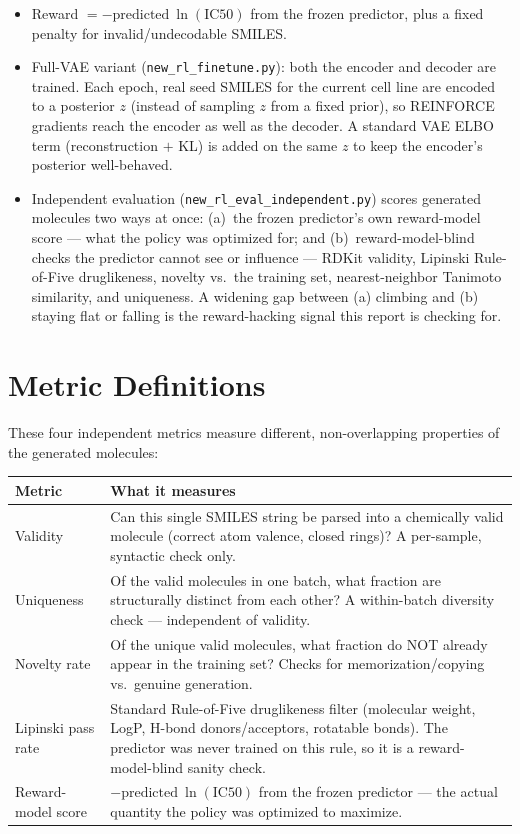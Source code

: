 \documentclass[11pt]{article}
\newcommand{\code}[1]{\texttt{#1}}
\begin{document}
\begin{itemize}
  \item Reward $= -\text{predicted}\ \ln(\text{IC50})$ from the frozen predictor, plus a fixed penalty for invalid/undecodable SMILES.
  \item Full-VAE variant (\code{new\_rl\_finetune.py}): both the encoder and decoder are trained. Each epoch, real seed SMILES for the current cell line are encoded to a posterior $z$ (instead of sampling $z$ from a fixed prior), so REINFORCE gradients reach the encoder as well as the decoder. A standard VAE ELBO term (reconstruction $+$ KL) is added on the same $z$ to keep the encoder's posterior well-behaved.
  \item Independent evaluation (\code{new\_rl\_eval\_independent.py}) scores generated molecules two ways at once: (a)~the frozen predictor's own reward-model score --- what the policy was optimized for; and (b)~reward-model-blind checks the predictor cannot see or influence --- RDKit validity, Lipinski Rule-of-Five druglikeness, novelty vs.\ the training set, nearest-neighbor Tanimoto similarity, and uniqueness. A widening gap between (a) climbing and (b) staying flat or falling is the reward-hacking signal this report is checking for.
\end{itemize}

\section{Metric Definitions}

These four independent metrics measure different, non-overlapping properties of the generated molecules:

\begin{center}
\begin{tabular}{@{}l p{}@{}}
\toprule
\textbf{Metric} & \textbf{What it measures} \\
\midrule
Validity & Can this single SMILES string be parsed into a chemically valid molecule (correct atom valence, closed rings)? A per-sample, syntactic check only. \\
Uniqueness & Of the valid molecules in one batch, what fraction are structurally distinct from each other? A within-batch diversity check --- independent of validity. \\
Novelty rate & Of the unique valid molecules, what fraction do NOT already appear in the training set? Checks for memorization/copying vs.\ genuine generation. \\
Lipinski pass rate & Standard Rule-of-Five druglikeness filter (molecular weight, LogP, H-bond donors/acceptors, rotatable bonds). The predictor was never trained on this rule, so it is a reward-model-blind sanity check. \\
Reward-model score & $-\text{predicted}\ \ln(\text{IC50})$ from the frozen predictor --- the actual quantity the policy was optimized to maximize. \\
\bottomrule
\end{tabular}
\end{center}
\end{document}
